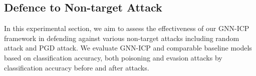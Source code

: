 \documentclass[conference]{IEEEtran}
\begin{document}





\subsection{Defence to Non-target Attack}
In this experimental section, we aim to assess the effectiveness of our GNN-ICP framework in defending against various non-target attacks including random attack and PGD attack. We evaluate GNN-ICP and comparable baseline models based on classification accuracy, both poisoning and evasion attacks by classification accuracy before and after attacks.
\end{document}
